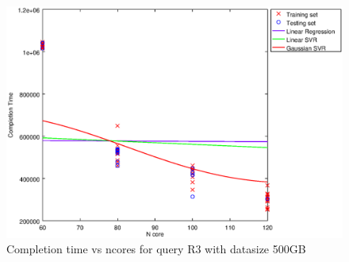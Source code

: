 
\begin {figure}[hbtp]
\centering
\includegraphics[width=\textwidth]{output/R3_500_LINEAR_NCORE/plot_R3_500_bestmodels.eps}
\caption{Completion time vs ncores for query R3 with datasize 500GB}
\label{fig:coreonly_linear_R3_500}
\end {figure}
